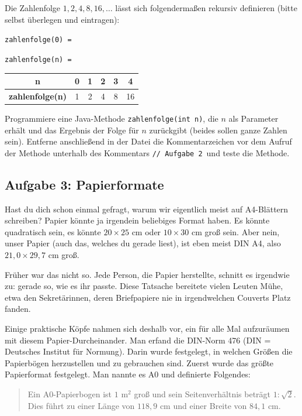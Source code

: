 Die Zahlenfolge $1, 2, 4, 8, 16, \ldots$ lässt sich folgendermaßen rekursiv
definieren (bitte selbst überlegen und eintragen):

\medskip
\noindent \texttt{zahlenfolge(0) = }

\medskip
\noindent \texttt{zahlenfolge(n) = }

\medskip
\begin{tabular}{|c|c|c|c|c|c|}\hline
\textbf{n}              & 0 & 1 & 2 & 3 &  4 \\ \hline
\textbf{zahlenfolge(n)} & 1 & 2 & 4 & 8 & 16 \\ \hline
\end{tabular}

\medskip
Programmiere eine Java-Methode \lstinline|zahlenfolge(int n)|, die $n$ als Parameter
erhält und das Ergebnis der Folge für $n$ zurückgibt (beides sollen ganze Zahlen sein). 
Entferne anschließend in der Datei die Kommentarzeichen vor dem Aufruf der Methode unterhalb des
Kommentars \glqq\lstinline|// Aufgabe 2|\grqq\ und teste die Methode.


\subsection{Aufgabe 3: Papierformate}

Hast du dich schon einmal gefragt, warum wir eigentlich meist auf A4-Blättern
schreiben? Papier könnte ja irgendein beliebiges Format haben. Es könnte
quadratisch sein, es könnte $20 \times 25\text{ cm}$ oder $10 \times 30\text{ cm}$ groß sein. Aber
nein, unser Papier (auch das, welches du gerade liest), ist eben meist DIN A4,
also $21{,}0 \times 29{,}7\text{ cm}$ groß.

Früher war das nicht so. Jede Person, die Papier herstellte, schnitt es
irgendwie zu: gerade so, wie es ihr passte. Diese Tatsache bereitete vielen
Leuten Mühe, etwa den Sekretärinnen, deren Briefpapiere nie in irgendwelchen
Couverts Platz fanden.

Einige praktische Köpfe nahmen sich deshalb vor, ein für alle Mal aufzuräumen
mit diesem Papier-Durcheinander. Man erfand die DIN-Norm 476 (DIN = Deutsches
Institut für Normung). Darin wurde festgelegt, in welchen Größen die Papierbögen
herzustellen und zu gebrauchen sind. Zuerst wurde das größte Papierformat
festgelegt. Man nannte es A0 und definierte Folgendes:

\begin{quotation}
\noindent Ein A0-Papierbogen ist $1\text{ m}^2$ groß und sein Seitenverhältnis 
beträgt $1 : \sqrt{2}$. Dies führt zu einer Länge von $118{,}9\text{ cm}$ und 
einer Breite von $84{,}1\text{ cm}$.
\end{quotation}

